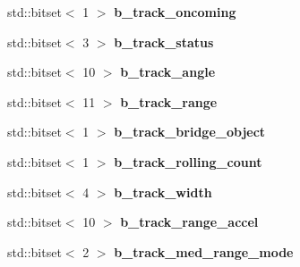 \begin{DoxyCompactItemize}
\item 
\hypertarget{class_radar_controller_addf9cc22f4190ab2bc4a9b8b4d2cead7}{}std\+::bitset$<$ 1 $>$ {\bfseries b\+\_\+track\+\_\+oncoming}\label{class_radar_controller_addf9cc22f4190ab2bc4a9b8b4d2cead7}

\item 
\hypertarget{class_radar_controller_a7edb023acbee9fb877476cc0120d2e43}{}std\+::bitset$<$ 3 $>$ {\bfseries b\+\_\+track\+\_\+status}\label{class_radar_controller_a7edb023acbee9fb877476cc0120d2e43}

\item 
\hypertarget{class_radar_controller_a4fc22579cd1e643c38f95b64e22f67b0}{}std\+::bitset$<$ 10 $>$ {\bfseries b\+\_\+track\+\_\+angle}\label{class_radar_controller_a4fc22579cd1e643c38f95b64e22f67b0}

\item 
\hypertarget{class_radar_controller_a7573f5e2f4a9dbc9c017993945d944b7}{}std\+::bitset$<$ 11 $>$ {\bfseries b\+\_\+track\+\_\+range}\label{class_radar_controller_a7573f5e2f4a9dbc9c017993945d944b7}

\item 
\hypertarget{class_radar_controller_afd2b9ee7bcca186751ed1275053fce69}{}std\+::bitset$<$ 1 $>$ {\bfseries b\+\_\+track\+\_\+bridge\+\_\+object}\label{class_radar_controller_afd2b9ee7bcca186751ed1275053fce69}

\item 
\hypertarget{class_radar_controller_abdf055fd6cbf1b8ada540412d9887616}{}std\+::bitset$<$ 1 $>$ {\bfseries b\+\_\+track\+\_\+rolling\+\_\+count}\label{class_radar_controller_abdf055fd6cbf1b8ada540412d9887616}

\item 
\hypertarget{class_radar_controller_a1d70bd11c6e4b49ac20904bd12f7ebfd}{}std\+::bitset$<$ 4 $>$ {\bfseries b\+\_\+track\+\_\+width}\label{class_radar_controller_a1d70bd11c6e4b49ac20904bd12f7ebfd}

\item 
\hypertarget{class_radar_controller_aa2882da695492e159ad49dd2b929124b}{}std\+::bitset$<$ 10 $>$ {\bfseries b\+\_\+track\+\_\+range\+\_\+accel}\label{class_radar_controller_aa2882da695492e159ad49dd2b929124b}

\item 
\hypertarget{class_radar_controller_a821b44fe7e56e95fe6613ed9d6c27501}{}std\+::bitset$<$ 2 $>$ {\bfseries b\+\_\+track\+\_\+med\+\_\+range\+\_\+mode}\label{class_radar_controller_a821b44fe7e56e95fe6613ed9d6c27501}


\end{DoxyCompactItemize}
